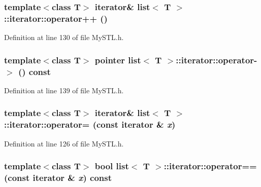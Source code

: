 \subsubsection[{operator++}]{\setlength{\rightskip}{0pt plus 5cm}template$<$class T$>$ {\bf iterator}\& {\bf list}$<$ T $>$::iterator::operator++ ()}\label{classlist_1_1iterator_ac1a52b81e6857a2f766cad8ae9b7e3ef}


Definition at line 130 of file MySTL.h.

\subsubsection[{operator-\/$>$}]{\setlength{\rightskip}{0pt plus 5cm}template$<$class T$>$ {\bf pointer} {\bf list}$<$ T $>$::iterator::operator-\/$>$ () const}\label{classlist_1_1iterator_a3aa011f80d0fd23ff23930b5a872755a}


Definition at line 139 of file MySTL.h.

\subsubsection[{operator=}]{\setlength{\rightskip}{0pt plus 5cm}template$<$class T$>$ {\bf iterator}\& {\bf list}$<$ T $>$::iterator::operator= (const {\bf iterator} \& {\em x})}\label{classlist_1_1iterator_a04b0adf36bbb2c958040e5a505be6393}


Definition at line 126 of file MySTL.h.

\subsubsection[{operator==}]{\setlength{\rightskip}{0pt plus 5cm}template$<$class T$>$ bool {\bf list}$<$ T $>$::iterator::operator== (const {\bf iterator} \& {\em x}) const}\label{classlist_1_1iterator_a5be3a6de9428364e874fcbd861d0ed6c}



